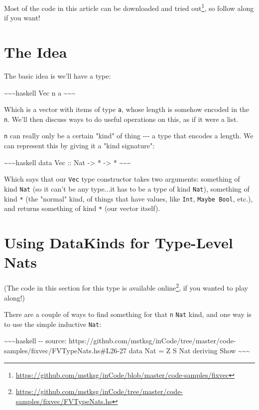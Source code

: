 \documentclass[]{article}
\renewcommand{\href}[2]{#2\footnote{\url{#1}}}
\begin{document}
Most of the code in this article can be
\href{https://github.com/mstksg/inCode/blob/master/code-samples/fixvec}{downloaded
and tried out}, so follow along if you want!

\section{The Idea}

The basic idea is we'll have a type:

\textasciitilde{}\textasciitilde{}\textasciitilde{}haskell Vec n a
\textasciitilde{}\textasciitilde{}\textasciitilde{}

Which is a vector with items of type \texttt{a}, whose length is somehow encoded
in the \texttt{n}. We'll then discuss ways to do useful operations on this, as
if it were a list.

\texttt{n} can really only be a certain "kind" of thing -\/-\/- a type that
encodes a length. We can represent this by giving it a "kind signature":

\textasciitilde{}\textasciitilde{}\textasciitilde{}haskell data Vec :: Nat
-\textgreater{} * -\textgreater{} *
\textasciitilde{}\textasciitilde{}\textasciitilde{}

Which says that our \texttt{Vec} type constructor takes two arguments: something
of kind \texttt{Nat} (so it can't be any type...it has to be a type of kind
\texttt{Nat}), something of kind \texttt{*} (the "normal" kind, of things that
have values, like \texttt{Int}, \texttt{Maybe\ Bool}, etc.), and returns
something of kind \texttt{*} (our vector itself).

\section{Using DataKinds for Type-Level Nats}

(The code in this section for this type is
\href{https://github.com/mstksg/inCode/tree/master/code-samples/fixvec/FVTypeNats.hs}{available
online}, if you wanted to play along!)

There are a couple of ways to find something for that \texttt{n} \texttt{Nat}
kind, and one way is to use the simple inductive \texttt{Nat}:

\textasciitilde{}\textasciitilde{}\textasciitilde{}haskell -\/- source:
https://github.com/mstksg/inCode/tree/master/code-samples/fixvec/FVTypeNats.hs\#L26-27
data Nat = Z \textbar{} S Nat deriving Show
\textasciitilde{}\textasciitilde{}\textasciitilde{}
\end{document}
